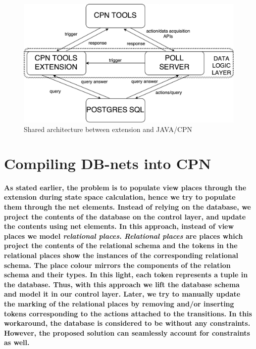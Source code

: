 \begin{figure}[!htbp]
	\centering
	\includegraphics[scale = 0.40]{DBN_SS_Layer_Architecture_Shared.pdf}
	\caption{Shared architecture between extension and JAVA/CPN}
	\label{fig:DBN_SS_Layer_Architecture_Shared}
\end{figure}

\section{Compiling DB-nets into CPN}
\paragraph*{\textnormal{As stated earlier, the problem is to populate view places through the extension during state space calculation, hence we try to populate them through the net elements. Instead of relying on the database, we project the contents of the database on the control layer, and update the contents using net elements. In this approach, instead of view places we model \textit{relational places}. \textit{Relational places} are places which project the contents of the relational schema and the tokens in the relational places show the instances of the corresponding relational schema. The place colour mirrors the components of the relation schema and their types. In this light, each token represents a tuple in the database. Thus, with this approach we lift the database schema and model it in our control layer.  Later, we try to manually update the marking of the relational places by removing and/or inserting tokens corresponding to the actions attached to the transitions. In this workaround, the database is considered to be without any constraints. However, the proposed solution can seamlessly account for constraints as well.}}

